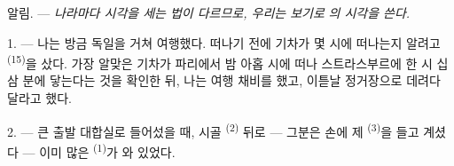 %
%
%
%
%

\VUsaut{4.0mm}
\VUsaut{2.4mm}
\VUsaut{3.4mm}
\textsc{알림.} --- \textit{나라마다 시각을 세는 법이 다르므로, 우리는 보기로}
 \textit{의 시각을 쓴다.}

1. --- 나는 방금 독일을 거쳐 여행했다. 떠나기 전에 기차가 몇 시에 떠나는지 알려고
 \textsuperscript{(15)}을 샀다. 가장 알맞은 기차가 파리에서 밤 아홉
시에 떠나 스트라스부르에 한 시 십삼 분에 닿는다는 것을 확인한 뒤, 나는 여행 채비를
했고, 이튿날 정거장으로 데려다 달라고 했다.

2. --- 큰 출발 대합실로 들어섰을 때, 시골  \textsuperscript{(2)} 뒤로 —
그분은 손에 제  \textsuperscript{(3)}을 들고 계셨다 — 이미 많은
 \textsuperscript{(1)}가 와 있었다.

